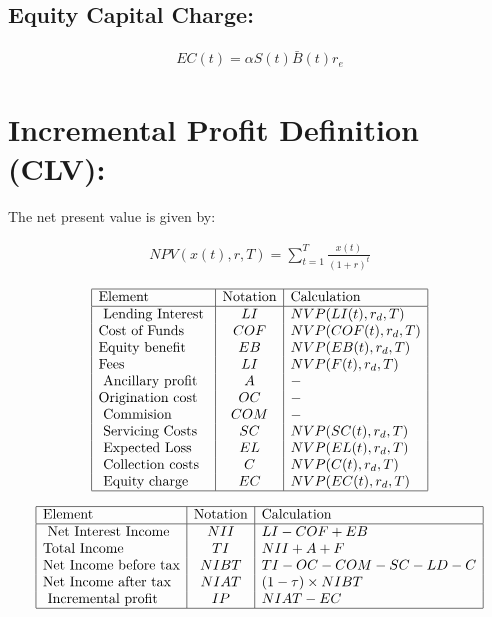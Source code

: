 \documentclass[12pt]{book}
\begin{document}
\subsection{ Equity Capital Charge: }
\begin{align}
 EC(t) =  \alpha S(t)\bar{ B}(t) r_e
\end{align}


\section{ Incremental Profit Definition (CLV): }
The net present value is given by:

\begin{align}
NPV(x(t),r,T)=\sum_{t=1}^T \frac{x(t)}{(1+r)^t}
\end{align}

\renewcommand{\arraystretch}{1.5} %
\begin{center} %
\[ %
\begin{array}{|l|c|l|} \hline %
\mbox{Element} & \mbox{Notation} & \mbox{Calculation}\\ \hline
\mbox{ Lending Interest }  & LI & NVP(LI(t),r_d,T)\\
\mbox{Cost of Funds   }  & COF & NVP(COF(t),r_d,T)\\
\mbox{Equity benefit }  & EB & NVP(EB(t),r_d,T)\\
\mbox{Fees }  & LI & NVP(F(t),r_d,T)\\
\mbox{ Ancillary profit }  & A & -\\
\mbox{Origination cost}  & OC & -\\
\mbox{ Commision  }  & COM & -\\
\mbox{ Servicing Costs}  & SC & NVP(SC(t),r_d,T)\\
\mbox{ Expected Loss }  & EL & NVP(EL(t),r_d,T)\\
\mbox{ Collection costs }  & C & NVP(C(t),r_d,T)\\
\mbox{ Equity charge}  & EC & NVP(EC(t),r_d,T)\\

\hline
\end{array} %
\] %
\end{center}

\renewcommand{\arraystretch}{1.5} %
\begin{center} %
\[ %
\begin{array}{|l|c|l|} \hline %
\mbox{Element} & \mbox{Notation} & \mbox{Calculation}\\ \hline
\mbox{ Net Interest Income }  & NII & LI-COF+EB\\
\mbox{Total Income  }  & TI & NII+A+F\\
\mbox{Net Income before tax}  & NIBT & TI-OC-COM-SC-LD-C\\
\mbox{Net Income after tax }  & NIAT&(1-\tau)\times NIBT \\
\mbox{ Incremental profit  }  & IP & NIAT-EC\\

\hline
\end{array} %
\] %
\end{center}
\end{document}
